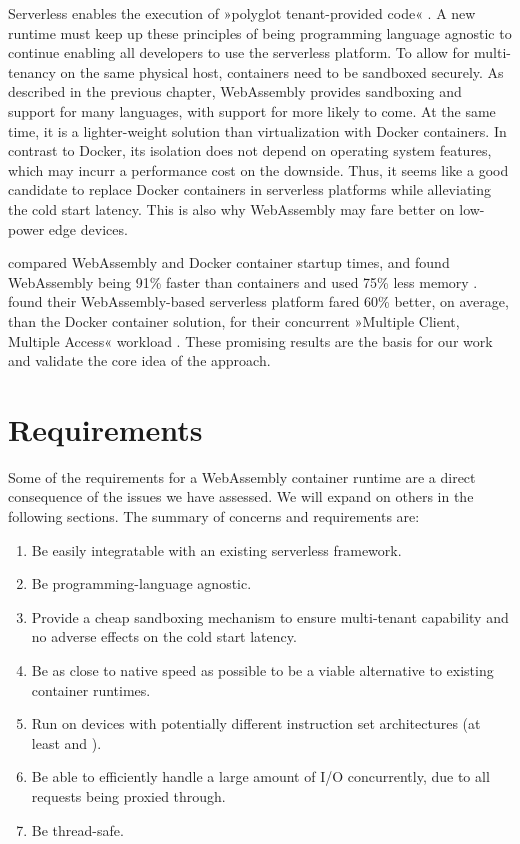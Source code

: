 Serverless enables the execution of »polyglot tenant-provided code« \cite{Nastic2018}. A new runtime must keep up these principles of being programming language agnostic to continue enabling all developers to use the serverless platform.
To allow for multi-tenancy on the same physical host, containers need to be sandboxed securely. As described in the previous chapter, WebAssembly provides sandboxing and support for many languages, with support for more likely to come. At the same time, it is a lighter-weight solution than virtualization with Docker containers. In contrast to Docker, its isolation does not depend on operating system features, which may incurr a performance cost on the downside. Thus, it seems like a good candidate to replace Docker containers in serverless platforms while alleviating the cold start latency. This is also why WebAssembly may fare better on low-power edge devices.

\citeauthor{Mendki2020} compared WebAssembly and Docker container startup times, and found WebAssembly being 91\% faster than containers and used 75\% less memory \cite{Mendki2020}. \citeauthor{Hall2019} found their WebAssembly-based serverless platform fared 60\% better, on average, than the Docker container solution, for their concurrent »Multiple Client, Multiple Access« workload \cite{Hall2019}. These promising results are the basis for our work and validate the core idea of the approach.

\section{Requirements}

Some of the requirements for a WebAssembly container runtime are a direct consequence of the issues we have assessed. We will expand on others in the following sections. The summary of concerns and requirements are:

\begin{enumerate}
    \item Be easily integratable with an existing serverless framework.
    \item Be programming-language agnostic.
    \item Provide a cheap sandboxing mechanism to ensure multi-tenant capability and no adverse effects on the cold start latency.
    \item Be as close to native speed as possible to be a viable alternative to existing container runtimes.
    \item Run on devices with potentially different instruction set architectures (at least  and ).
    \item Be able to efficiently handle a large amount of I/O concurrently, due to all requests being proxied through.
    \item Be thread-safe.
\end{enumerate}

